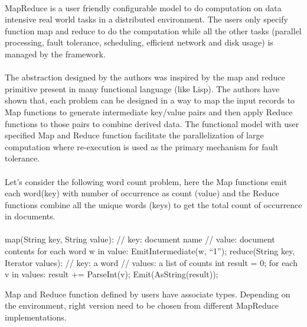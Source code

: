 \documentclass{article}
\begin{document}
\paragraph{}
MapReduce is a user friendly configurable model to do computation on data intensive real world tasks in a distributed environment. The users only specify function map and reduce to do the computation while all the other tasks (parallel processing, fault tolerance, scheduling, efficient network and disk usage) is managed by the framework.

\paragraph{}
The abstraction designed by the authors was inspired by the map and reduce primitive present in many functional language (like Lisp). The authors have shown that, each problem can be designed in a way to map the input records to Map functions to generate intermediate key/value pairs and then apply Reduce functions to those pairs to combine derived data. The functional model with user specified Map and Reduce function facilitate the parallelization of large computation where re-execution is used as the primary mechanism for fault tolerance.

\paragraph{}
Let's consider the following word count problem, here the Map functions emit each word(key) with number of occurrence as count (value) and the Reduce functions combine all the unique words (keys) to get the total count of occurrence in documents.

\paragraph{}
map(String key, String value):
// key: document name
// value: document contents
for each word w in value:
EmitIntermediate(w, “1”);
reduce(String key, Iterator values):
// key: a word
// values: a list of counts
int result = 0;
for each v in values:
result += ParseInt(v);
Emit(AsString(result));

Map and Reduce function defined by users have associate types. Depending on the environment, right version need to be chosen from different MapReduce implementations.
\end{document}
